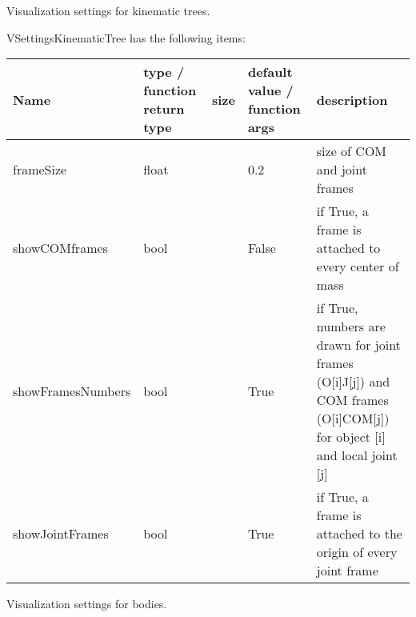 
\label{sec:VSettingsKinematicTree}
Visualization settings for kinematic trees.

\noindent VSettingsKinematicTree has the following items:
\begin{center}
  \footnotesize
  \begin{longtable}{| p{4.2cm} | p{2.5cm} | p{0.3cm} | p{3.0cm} | p{6cm} |}
    \hline
    \bf Name & \bf type / function return type & \bf size & \bf default value / function args & \bf description \\ \hline
    frameSize &     float &      &     0.2 &     size of COM and joint frames\\ \hline
    showCOMframes &     bool &      &     False &     if True, a frame is attached to every center of mass\\ \hline
    showFramesNumbers &     bool &      &     True &     if True, numbers are drawn for joint frames (O[i]J[j]) and COM frames (O[i]COM[j]) for object [i] and local joint [j]\\ \hline
    showJointFrames &     bool &      &     True &     if True, a frame is attached to the origin of every joint frame\\ \hline
	  \end{longtable}
	\end{center}



\label{sec:VSettingsBodies}
Visualization settings for bodies.

